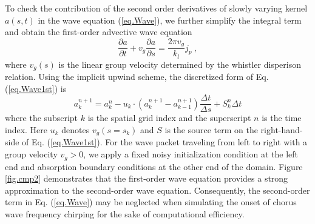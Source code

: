 \documentclass[times,12pt,3p,longtitle]{elsarticle}
\begin{document}
To check the contribution of the second order derivatives of slowly varying kernel $a(s,t)$ in the wave equation (\ref{eq.Wave}), we further simplify the integral term and obtain the first-order advective wave equation 
\begin{equation}\label{eq.Wave1st}
    \frac{\partial a}{\partial t} + v_{g} \frac{\partial a}{\partial s} = \frac{2\pi v_g}{k_l} j_{p}~,
\end{equation}
where $v_g(s)$ is the linear group velocity determined by the whistler disperison relation.
Using the implicit upwind scheme,
 the discretized form of Eq. (\ref{eq.Wave1st})  is
\begin{equation}
a_k^{n+1} = a_k^{n} - u_{k}\cdot\left(a_{k}^{n+1}-a_{k-1}^{n+1}\right)\frac{\Delta t}{\Delta s} + S_k^n \Delta t
\end{equation}
where 
the subscript $k$ is the spatial grid index
and
the superscript $n$ is the time index.
Here 
$u_k $ denotes $ v_g(s=s_k)$ and 
$S$ is the source term on the right-hand-side of Eq. (\ref{eq.Wave1st}).
For the wave packet traveling from left to right 
with a group velocity  $v_g>0$, 
we apply 
a fixed noisy initialization condition at the left end and 
absorption boundary conditions at the other end of the domain.
Figure \ref{fig.cmp2} demonstrates that the first-order wave equation provides a strong approximation to the second-order wave equation. Consequently, the second-order term in Eq. (\ref{eq.Wave}) may be neglected when simulating the onset of chorus wave frequency chirping for the sake of computational efficiency.
\end{document}
